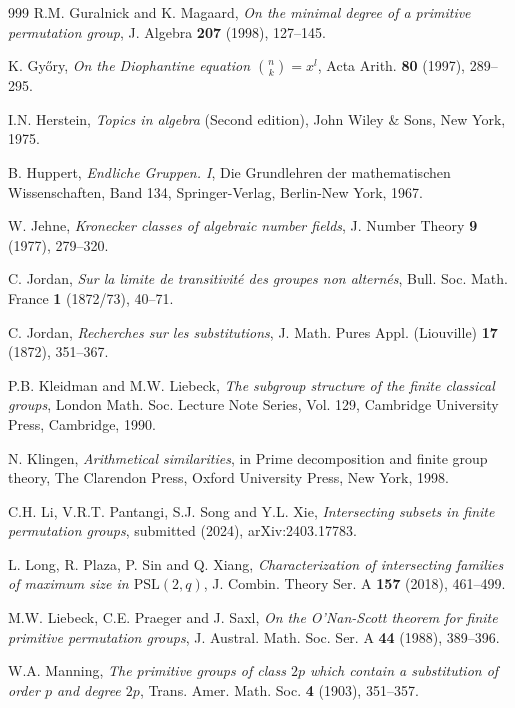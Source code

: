 \documentclass[twoside,a4paper,reqno,11pt]{amsart}
\newcommand{\<}{\langle}
\renewcommand{\>}{\rangle}
\newcommand{\PSL}{\mathrm{PSL}}
\theoremstyle{definition}
\begin{document}
\begin{thebibliography}{999}
		R.M. Guralnick and K. Magaard, \textit{On the minimal degree of a primitive permutation group}, J. Algebra \textbf{207} (1998), 127–145.
		
		K. Győry, \textit{On the Diophantine equation ${n\choose k} = x^l$}, Acta Arith. \textbf{80} (1997), 289–295.
		
		I.N. Herstein, \textit{Topics in algebra} (Second edition), John Wiley \& Sons, New York, 1975.
		
		B. Huppert, \textit{Endliche Gruppen. I}, Die Grundlehren der mathematischen Wissenschaften, Band 134,
		Springer-Verlag, Berlin-New York, 1967.
		
		W. Jehne, \textit{Kronecker classes of algebraic number fields}, J. Number Theory \textbf{9} (1977), 279–320.
		
		C. Jordan, \textit{Sur la limite de transitivité des groupes non alternés}, Bull. Soc. Math. France \textbf{1} (1872/73), 40–71.
		
		C. Jordan, \textit{Recherches sur les substitutions}, J. Math. Pures Appl. (Liouville) \textbf{17} (1872), 351–367.
		
		P.B. Kleidman and M.W. Liebeck, \textit{The subgroup structure of the finite classical groups}, London Math. Soc. Lecture Note Series, Vol. 129, Cambridge University Press, Cambridge, 1990.
		
		N. Klingen, \textit{Arithmetical similarities}, in Prime decomposition and finite group theory, The Clarendon Press, Oxford University Press, New York, 1998.
		
		C.H. Li, V.R.T. Pantangi, S.J. Song and Y.L. Xie, \textit{Intersecting subsets in finite permutation groups}, submitted (2024), arXiv:2403.17783.
		
		L. Long, R. Plaza, P. Sin and Q. Xiang, \textit{Characterization of intersecting families of maximum size in $\PSL(2,q)$}, J. Combin. Theory Ser. A \textbf{157} (2018), 461–499.
		
		M.W. Liebeck, C.E. Praeger and J. Saxl, \textit{On the O'Nan-Scott theorem for finite primitive permutation groups}, J. Austral. Math. Soc. Ser. A \textbf{44} (1988), 389–396.
		
		W.A. Manning, \textit{The primitive groups of class $2p$ which contain a substitution of order $p$ and degree $2p$}, Trans. Amer. Math. Soc. \textbf{4} (1903), 351–357.
		

\end{thebibliography}
\end{document}
